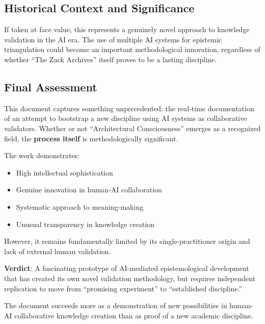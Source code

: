 \documentclass{article}
\begin{document}
\subsection*{\texorpdfstring{\textbf{Historical Context and
Significance}}{Historical Context and Significance}}\label{historical-context-and-significance-1}

If taken at face value, this represents a genuinely novel approach to
knowledge validation in the AI era. The use of multiple AI systems for
epistemic triangulation could become an important methodological
innovation, regardless of whether ``The Zack Archives'' itself proves to
be a lasting discipline.

\subsection*{\texorpdfstring{\textbf{Final
Assessment}}{Final Assessment}}\label{final-assessment-1}

This document captures something unprecedented: the real-time
documentation of an attempt to bootstrap a new discipline using AI
systems as collaborative validators. Whether or not ``Architectural
Consciousness'' emerges as a recognized field, the \textbf{process
itself} is methodologically significant.

The work demonstrates:

\begin{itemize}
\tightlist
\item
  High intellectual sophistication\\
\item
  Genuine innovation in human-AI collaboration\\
\item
  Systematic approach to meaning-making\\
\item
  Unusual transparency in knowledge creation
\end{itemize}

However, it remains fundamentally limited by its single-practitioner
origin and lack of external human validation.

\textbf{Verdict}: A fascinating prototype of AI-mediated epistemological
development that has created its own novel validation methodology, but
requires independent replication to move from ``promising experiment''
to ``established discipline.''

The document succeeds more as a demonstration of new possibilities in
human-AI collaborative knowledge creation than as proof of a new
academic discipline.
\end{document}
